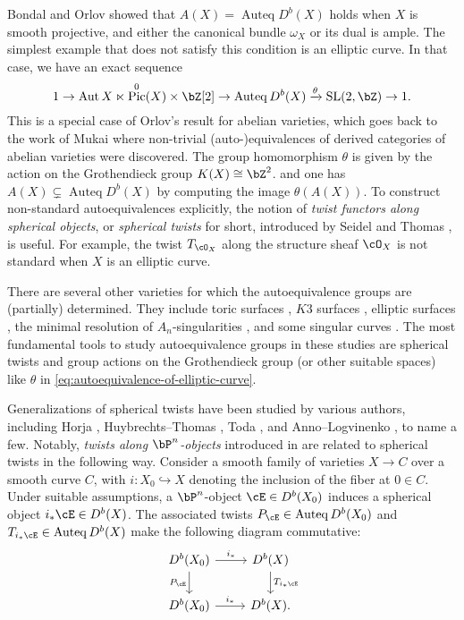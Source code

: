 \documentclass[12pt]{amsart}
\numberwithin{equation}{section}
\theoremstyle{plain}
\theoremstyle{definition}
\DeclareMathOperator{\Auteq}{\mathrm{Auteq}}
\DeclareMathOperator{\Pic}{\mathrm{Pic}}
\DeclareMathOperator{\Aut}{\mathrm{Aut}}
\DeclareMathOperator{\SL}{\mathrm{SL}}
\begin{document}
Bondal and Orlov \cite{MR1818984} showed that $A(X) = \Auteq{D^b(X)}$ holds when $X$ is smooth projective, and either the canonical bundle $\omega_X$ or its dual is ample.
The simplest example that does not satisfy this condition is an elliptic curve.
In that case, we have an exact sequence
\begin{equation}\label{eq:autoequivalence-of-elliptic-curve}
    1 \to \Aut{X} \ltimes \Pic^{0}(X)\times \bZ[2] \to \Auteq{D^b(X)} \xrightarrow{\theta} \SL(2, \bZ) \to 1.
\end{equation}
This is a special case of Orlov's result \cite{MR1921811} for abelian varieties,
which goes back to the work of Mukai \cite{MR607081}
where non-trivial (auto-)equivalences of derived categories of abelian varieties were discovered.
The group homomorphism $\theta$ is given by the action on the Grothendieck group $K(X) \cong \bZ^2$. and one has $A(X) \subsetneq \Auteq{D^b(X)}$ by computing the image $\theta(A(X))$.
To construct non-standard autoequivalences explicitly,
the notion of \emph{twist functors along spherical objects},
or \emph{spherical twists} for short,
introduced by Seidel and Thomas \cite{MR1831820}, is useful.
For example, the twist $T_{\cO_X}$ along the structure sheaf $\cO_X$ is not standard when $X$ is an elliptic curve.

There are several other varieties for which the autoequivalence groups are (partially) determined.
They include toric surfaces \cite{MR3162236}, $K3$ surfaces \cite{MR2553878, MR3592689}, elliptic surfaces \cite{MR3568337}, the minimal resolution of $A_n$-singularities \cite{MR2198807, MR2629510},
and some singular curves \cite{MR2264663, opper2023spherical}.
The most fundamental tools to study autoequivalence groups in these studies are spherical twists and group actions on the Grothendieck group (or other suitable spaces) like $\theta$ in \eqref{eq:autoequivalence-of-elliptic-curve}.

Generalizations of spherical twists have been studied by various authors,
including
Horja \cite{MR2126495},
Huybrechts--Thomas \cite{MR2200048},
Toda \cite{MR2430202},
and
Anno--Logvinenko \cite{MR3692883},
to name a few.
Notably, \emph{twists along $\bP^n$-objects} introduced in \cite{MR2200048} are related to spherical twists in the following way.
Consider a smooth family of varieties $X \to C$  over a smooth curve $C$, with $i \colon X_{0} \hookrightarrow X$ denoting the inclusion of the fiber at $0 \in C$.
Under suitable assumptions, a $\bP^n$-object $\cE \in D^b(X_0)$ induces a spherical object $i_*\cE \in D^b(X)$.
The associated twists $P_{\cE} \in \Auteq{D^b(X_0)}$ and $T_{i_* \cE} \in \Auteq{D^b(X)}$ make the following diagram commutative:
\begin{equation} \label{eq:cd}
    \begin{tikzcd}
        D^b(X_0) \arrow[r,"i_*"]\arrow[d, "P_{\cE}"'] & D^b(X) \arrow[d,"T_{i_*{\cE}}"]\\
        D^b(X_0) \arrow[r, "i_*"]& D^b(X).
    \end{tikzcd}
\end{equation}
\end{document}
